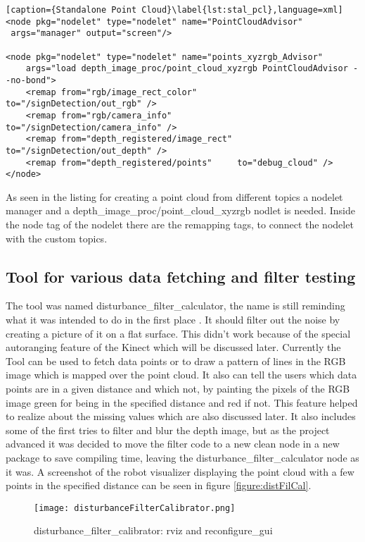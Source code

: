 \begin{lstlisting}[caption={Standalone Point Cloud}\label{lst:stal_pcl},language=xml]
<node pkg="nodelet" type="nodelet" name="PointCloudAdvisor" 
 args="manager" output="screen"/>

<node pkg="nodelet" type="nodelet" name="points_xyzrgb_Advisor" 
	args="load depth_image_proc/point_cloud_xyzrgb PointCloudAdvisor --no-bond">
    <remap from="rgb/image_rect_color"        to="/signDetection/out_rgb" />
    <remap from="rgb/camera_info"             to="/signDetection/camera_info" />
    <remap from="depth_registered/image_rect" to="/signDetection/out_depth" />
    <remap from="depth_registered/points"     to="debug_cloud" />
</node>
\end{lstlisting}

As seen in the listing for creating a point cloud from different topics a nodelet manager and a 
depth\_image\_proc/point\_cloud\_xyzrgb nodlet is needed. Inside the node tag of the nodelet
there are the remapping tags, to connect the nodelet with the custom topics.


\subsection{Tool for various data fetching and filter testing}
The tool was named disturbance\_filter\_calculator, the name is still reminding what it was intended to do in the first place
. It should filter out the noise by creating a picture of it on a flat surface. This didn't work because of the special 
autoranging feature of the Kinect which will be discussed later. Currently the Tool can be used to fetch data points or to
draw a pattern of lines in the RGB image which is mapped over the point cloud. It also can tell the users which data points
are in a given distance and which not, by painting the pixels of the RGB image green for being in the specified distance
and red if not. This feature helped to realize about the missing values which are also discussed later. It also includes
some of the first tries to filter and blur the depth image, but as the project advanced it was decided to move the 
filter code to a new clean node in a new package to save compiling time, leaving the disturbance\_filter\_calculator 
node as it was. A screenshot of the robot visualizer displaying the point cloud with a few points in the specified distance
can be seen in figure \vref{figure:distFilCal}.

\begin{figure}[htp]
\begin{center}
  \texttt{[image: disturbanceFilterCalibrator.png]}
  \caption{disturbance\_filter\_calibrator: rviz and reconfigure\_gui}
  \label{figure:distFilCal}
\end{center}
\end{figure}


